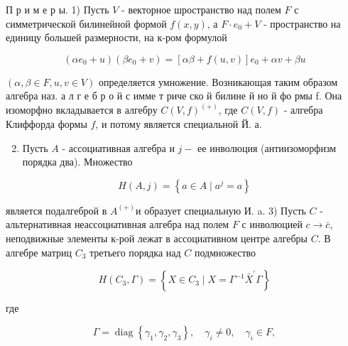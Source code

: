 \documentclass[10pt]{article}
\begin{document}
П р и м е р ы. 1) Пусть $V$ - векторное шространство над полем $F$ с симметрической билинейной формой $f(x, y)$, а $F \cdot e_{0}+V$ - пространство на единицу большей размерности, на к-ром формулой



\[

\left(\alpha e_{0}+u\right)\left(\beta e_{0}+v\right)=[\alpha \beta+f(u, v)] e_{0}+\alpha v+\beta u

\]



$(\alpha, \beta \in F, u, v \in V)$ определяется умножение. Возникающая таким образом алгебра наз. а л г е б р о й с имме т риче ско й билине й но й фо рмы f. Она изоморфно вкладывается в алгебру $C(V, f)^{(+)}$, где $C(V, f)$ - алгебра Клиффорда формы $f$, и потому является специальной Й. а.



\begin{enumerate}

  \setcounter{enumi}{1}

  \item Пусть $A$ - ассоциативная алгебра и $j-$ ее инволюция (антиизоморфизм порядка два). Множество

\end{enumerate}



\[

H(A, j)=\left\{a \in A \mid a^{j}=a\right\}

\]



является подалгеброй в $A^{(+)}$и образует специальную И. a. 3) Пусть $C$ - альтернативная неассоциативная алгебра над полем $F$ с инволюцией $c \rightarrow \bar{c}$, неподвижные элементы к-рой лежат в ассоциативном центре алгебры $C$. В алгебре матриц $C_{3}$ третьего порядка над $C$ подмножество



\[

H\left(C_{3}, \Gamma\right)=\left\{X \in C_{3} \mid X=\Gamma^{-1} \bar{X}^{\prime} \Gamma\right\}

\]



где



\[

\Gamma=\operatorname{diag}\left\{\gamma_{1}, \gamma_{2}, \gamma_{3}\right\}, \quad \gamma_{i} \neq 0, \quad \gamma_{i} \in F,

\]
\end{document}
